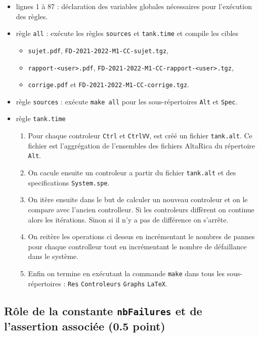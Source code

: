 \documentclass[a4paper]{book}
\begin{document}
\begin{itemize}
  \item lignes 1 à 87 : déclaration des variables globales nécessaires pour l'exécution des règles.
  \item règle \texttt{all} : exécute les règles \texttt{sources} et
    \texttt{tank.time} et compile les cibles
    \begin{itemize}
      \item \texttt{sujet.pdf}, \texttt{FD-2021-2022-M1-CC-sujet.tgz},
      \item \texttt{rapport-<user>.pdf}, \texttt{FD-2021-2022-M1-CC-rapport-<user>.tgz},
      \item \texttt{corrige.pdf} et \texttt{FD-2021-2022-M1-CC-corrige.tgz}.
    \end{itemize}
  \item règle \texttt{sources} : exécute \texttt{make all} pour les
    sous-répertoires \texttt{Alt} et \texttt{Spec}.
  \item règle \texttt{tank.time} 
      \begin{enumerate}
          \item Pour chaque controleur \texttt{Ctrl} et \texttt{CtrlVV}, est créé un fichier \texttt{tank.alt}. 
              Ce fichier est l'aggrégation de l'ensembles des fichiers AltaRica du répertoire \texttt{Alt}.
          \item On cacule ensuite un controleur a partir du fichier \texttt{tank.alt} et des specifications 
              \texttt{System.spe}.
          \item On itère ensuite dans le but de calculer un nouveau controleur et on le compare 
              avec l'ancien controlleur.
              Si les controleurs diffèrent on continue alors les itérations. 
              Sinon si il n'y a pas de différence on s'arrête.
          \item On reitère les operations ci dessus en incrémentant le nombres de pannes
              pour chaque controlleur tout en incrémentant le nombre de défaillance dans le système.
          \item Enfin on termine en exécutant la commande \texttt{make} dans tous les
              sous-répertoires : \texttt{Res} \texttt{Controleurs} \texttt{Graphs}
              \texttt{LaTeX}.
      \end{enumerate}
\end{itemize}

\subsection{Rôle de la constante {\tt nbFailures} et de l'assertion associée (0.5 point)}
\end{document}
